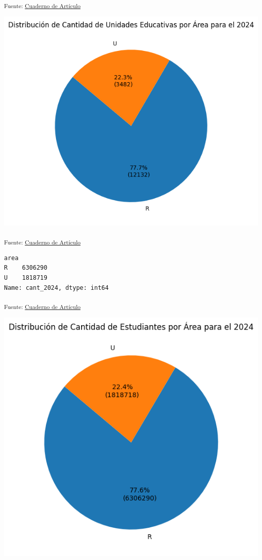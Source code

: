 \documentclass[
  12pt]{article}
\begin{document}
\textsubscript{Fuente:
\href{https://sociest.github.io/ue-report/index.ipynb.html}{Cuaderno de
Artículo}}

\includegraphics{index_files/figure-pdf/cell-25-output-1.png}

\textsubscript{Fuente:
\href{https://sociest.github.io/ue-report/index.ipynb.html}{Cuaderno de
Artículo}}

\begin{verbatim}
area
R    6306290
U    1818719
Name: cant_2024, dtype: int64
\end{verbatim}

\textsubscript{Fuente:
\href{https://sociest.github.io/ue-report/index.ipynb.html}{Cuaderno de
Artículo}}

\includegraphics{index_files/figure-pdf/cell-27-output-1.png}
\end{document}
